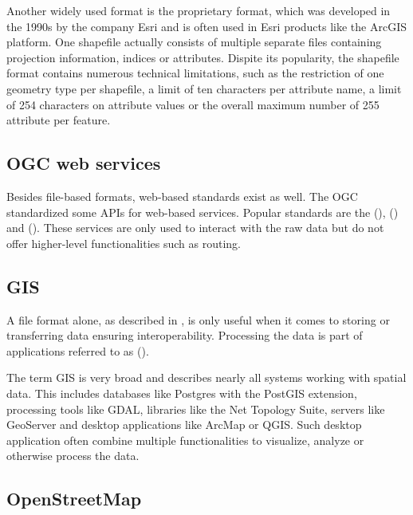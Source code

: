 			Another widely used format is the proprietary  format, which was developed in the 1990s by the company Esri \cite{esri-shapefile-file-ext-spec} and is often used in Esri products like the ArcGIS platform.
			One shapefile actually consists of multiple separate files containing projection information, indices or attributes.
			Dispite its popularity, the shapefile format contains numerous technical limitations, such as the restriction of one geometry type per shapefile, a limit of ten characters per attribute name, a limit of 254 characters on attribute values or the overall maximum number of 255 attribute per feature.
			
	\subsection{OGC web services}
	
		Besides file-based formats, web-based standards exist as well.
		The OGC standardized some APIs for web-based services.
		Popular standards are the  (),  () and  ().
		These services are only used to interact with the raw data but do not offer higher-level functionalities such as routing.
	
	\subsection{GIS}
	
		A file format alone, as described in , is only useful when it comes to storing or transferring data ensuring interoperability.
		Processing the data is part of applications referred to as  ().
		
		The term GIS is very broad and describes nearly all systems working with spatial data.
		This includes databases like Postgres with the PostGIS extension, processing tools like GDAL, libraries like the Net Topology Suite, servers like GeoServer and desktop applications like ArcMap or QGIS.
		Such desktop application often combine multiple functionalities to visualize, analyze or otherwise process the data.
	
	\subsection{OpenStreetMap}
	\label{subsec:osm}
	
